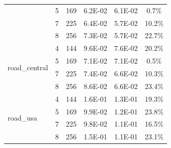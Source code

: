 \documentclass[conference, 10ppt]{IEEEtran}
\begin{document}
\begin{table}[htb]
\begin{tabular}[c]{| l | c | c | c | c | c |}
  &  5  &  169  &  6.2E-02  &  6.1E-02  &  0.7\% \\ \cline{2-6}
  &  7  &  225  &  6.4E-02  &  5.7E-02  &  10.2\% \\ \cline{2-6}
  &  8  &  256  &  7.3E-02  &  5.7E-02  &  22.7\% \\ \hline
\multirow{4}{*}{road\_central} &  4  &  144  &  9.6E-02  &  7.6E-02  &  20.2\% \\ \cline{2-6}
\  &  5  &  169  &  7.1E-02  &  7.1E-02  &  0.5\% \\ \cline{2-6}
  &  7  &  225  &  7.4E-02  &  6.6E-02  &  10.3\% \\ \cline{2-6}
  &  8  &  256  &  8.6E-02  &  6.6E-02  &  23.4\% \\ \hline
\multirow{4}{*}{road\_usa}   &  4  &  144  &  1.6E-01  &  1.3E-01  &  19.3\% \\ \cline{2-6}
  &  5  &  169  &  9.9E-02  &  1.2E-01  &  23.8\% \\ \cline{2-6}
  &  7  &  225  &  9.8E-02  &  1.1E-01  &  16.5\% \\ \cline{2-6}
  &  8  &  256  &  1.5E-01  &  1.1E-01  &  23.1\% \\ \hline
\end{tabular}
\end{table}
\end{document}
